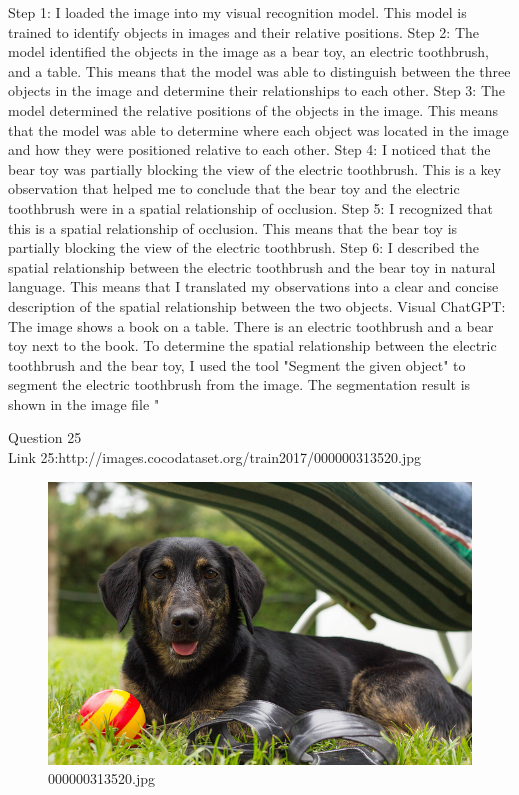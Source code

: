 \begin{enumerate}
        Step 1: I loaded the image into my visual recognition model. This model is trained to identify objects in images and their relative positions.
        Step 2: The model identified the objects in the image as a bear toy, an electric toothbrush, and a table. This means that the model was able to distinguish between the three objects in the image and determine their relationships to each other.
        Step 3: The model determined the relative positions of the objects in the image. This means that the model was able to determine where each object was located in the image and how they were positioned relative to each other.
        Step 4: I noticed that the bear toy was partially blocking the view of the electric toothbrush. This is a key observation that helped me to conclude that the bear toy and the electric toothbrush were in a spatial relationship of occlusion.
        Step 5: I recognized that this is a spatial relationship of occlusion. This means that the bear toy is partially blocking the view of the electric toothbrush.
        Step 6: I described the spatial relationship between the electric toothbrush and the bear toy in natural language. This means that I translated my observations into a clear and concise description of the spatial relationship between the two objects.
        \subitem Visual ChatGPT: The image shows a book on a table. There is an electric toothbrush and a bear toy next to the book. To determine the spatial relationship between the electric toothbrush and the bear toy, I used the tool "Segment the given object" to segment the electric toothbrush from the image. The segmentation result is shown in the image file "
    \end{enumerate}
Question 25\\
Link 25:http://images.cocodataset.org/train2017/000000313520.jpg
    \begin{figure}[h]
        \centering
        \includegraphics[width=0.8\linewidth]{../image set/easy/000000313520.jpg}
        \caption{000000313520.jpg}
    \end{figure}

